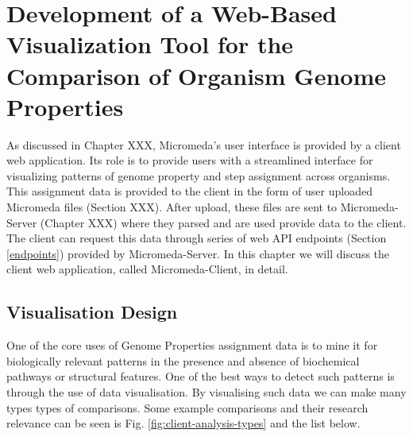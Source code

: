\chapter{Development of a Web-Based Visualization Tool for the Comparison of Organism Genome Properties} \label{micromeda-client}

As discussed in Chapter XXX, Micromeda's user interface is provided by a client web application. Its role is to provide users with a streamlined interface for visualizing patterns of genome property and step assignment across organisms. This assignment data is provided to the client in the form of user uploaded Micromeda files (Section XXX). After upload, these files are sent to Micromeda-Server (Chapter XXX) where they parsed and are used provide data to the client. The client can request this data through series of web API endpoints (Section \ref{endpoints}) provided by Micromeda-Server. In this chapter we will discuss the client web application, called Micromeda-Client, in detail.

\section{Visualisation Design}

One of the core uses of Genome Properties assignment data is to mine it for biologically relevant patterns in the presence and absence of biochemical pathways or structural features. One of the best ways to detect such patterns is through the use of data visualisation. By visualising such data we can make many types types of comparisons. Some example comparisons and their research relevance can be seen is Fig. \ref{fig:client-analysis-types} and the list below.

